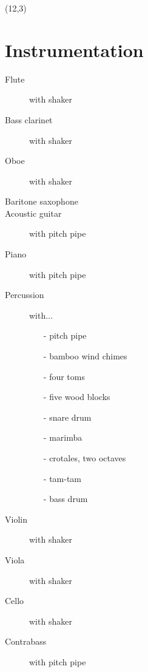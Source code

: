 \documentclass[10pt]{article}
\begin{document}
\begin{textblock}{11}(12,3)

\section{Instrumentation}

\begin{description}
    \item[Flute]
        with shaker
    \item[Bass clarinet]
        with shaker
    \item[Oboe]
        with shaker
    \item[Baritone saxophone]
    \item[Acoustic guitar]
        with pitch pipe
    \item[Piano]
        with pitch pipe
    \item[Percussion]
        with...
        \begin{itemize}
            \item[-] pitch pipe
            \item[-] bamboo wind chimes
            \item[-] four toms
            \item[-] five wood blocks
            \item[-] snare drum
            \item[-] marimba
            \item[-] crotales, two octaves
            \item[-] tam-tam
            \item[-] bass drum
        \end{itemize}
    \item[Violin]
        with shaker
    \item[Viola]
        with shaker
    \item[Cello]
        with shaker
    \item[Contrabass]
        with pitch pipe
\end{description}

\end{textblock}
\end{document}
